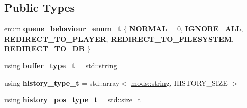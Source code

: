 \subsection*{Public Types}
\begin{DoxyCompactItemize}
\item 
\mbox{\label{structmods_1_1descriptor__data_ae2e0ea67631556e450dff243be5495ad}} 
enum {\bfseries queue\+\_\+behaviour\+\_\+enum\+\_\+t} \{ \newline
{\bfseries N\+O\+R\+M\+AL} = 0, 
{\bfseries I\+G\+N\+O\+R\+E\+\_\+\+A\+LL}, 
{\bfseries R\+E\+D\+I\+R\+E\+C\+T\+\_\+\+T\+O\+\_\+\+P\+L\+A\+Y\+ER}, 
{\bfseries R\+E\+D\+I\+R\+E\+C\+T\+\_\+\+T\+O\+\_\+\+F\+I\+L\+E\+S\+Y\+S\+T\+EM}, 
\newline
{\bfseries R\+E\+D\+I\+R\+E\+C\+T\+\_\+\+T\+O\+\_\+\+DB}
 \}
\item 
\mbox{\label{structmods_1_1descriptor__data_ad86b7f17bc8e871e64d258e496bd0f65}} 
using {\bfseries buffer\+\_\+type\+\_\+t} = std\+::string
\item 
\mbox{\label{structmods_1_1descriptor__data_a18f7b591af240f31c7eccfeac3dc7679}} 
using {\bfseries history\+\_\+type\+\_\+t} = std\+::array$<$ \hyperlink{structmods_1_1string}{mods\+::string}, H\+I\+S\+T\+O\+R\+Y\+\_\+\+S\+I\+ZE $>$
\item 
\mbox{\label{structmods_1_1descriptor__data_a15575d751f234163e66211a306065043}} 
using {\bfseries history\+\_\+pos\+\_\+type\+\_\+t} = std\+::size\+\_\+t
\end{DoxyCompactItemize}

